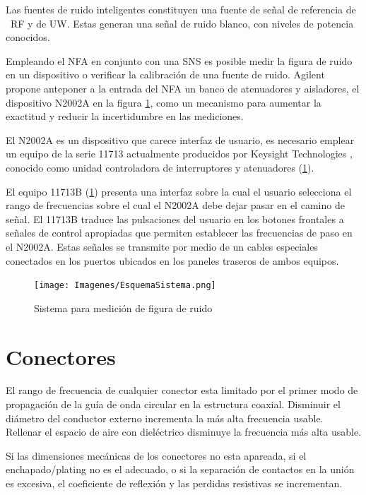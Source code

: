 \documentclass{article}
\begin{document}
	Las fuentes de ruido inteligentes constituyen una fuente de señal de referencia de \ RF y de UW. Estas generan una señal de ruido blanco, con niveles de potencia conocidos. 
	
	Empleando el NFA en conjunto con una SNS es posible medir la figura de ruido en un dispositivo o verificar la calibración de una fuente de ruido. Agilent propone anteponer a la entrada del NFA un banco de atenuadores y aisladores, el dispositivo N2002A en la figura \ref{Fig:EsquemaSistemaMedicion}, como un mecanismo para aumentar la exactitud y reducir la incertidumbre en las mediciones.
	
	El N2002A es un dispositivo que carece interfaz de usuario, es necesario emplear un equipo de la serie 11713 \textemdash actualmente producidos por Keysight Technologies \textemdash, conocido como unidad controladora de interruptores y atenuadores (\ref{Fig:EsquemaSistemaMedicion}). 
	
	El equipo 11713B (\ref{Fig:EsquemaSistemaMedicion}) presenta una interfaz sobre la cual el usuario selecciona el rango de frecuencias sobre el	cual el N2002A debe dejar pasar en el camino de señal. El 11713B traduce las pulsaciones del usuario en los botones frontales a señales de control apropiadas que permiten establecer las frecuencias de paso en el N2002A. Estas señales	se transmite por medio de un cables especiales conectados en los puertos ubicados en los paneles traseros de ambos equipos.
	
	\begin{figure}[h!]
		\centering
		\begin{minipage}{18.516cm}
			\texttt{[image: Imagenes/EsquemaSistema.png]}
		\end{minipage}
		\caption{Sistema para medición de figura de ruido}
		\label{Fig:EsquemaSistemaMedicion}
	\end{figure}

	\section{Conectores}
	
	El rango de frecuencia de cualquier conector esta limitado por el primer modo de propagación de la guía de onda circular
	en la estructura coaxial. Disminuir el diámetro del conductor externo incrementa la más alta frecuencia usable.
	Rellenar el espacio de aire con dieléctrico disminuye la frecuencia más alta usable.
	
	Si las dimensiones mecánicas de los conectores no esta apareada, si el enchapado/plating no es el adecuado, o si la
	separación de contactos en la unión es excesiva, el coeficiente de reflexión y las perdidas resistivas se incrementan.
	
\end{document}
